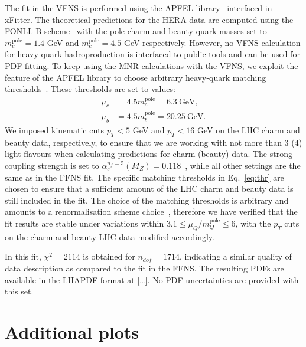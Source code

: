 \documentclass[12pt]{article}
\begin{document}
The fit in the VFNS is performed using the APFEL library~\cite{Bertone:2013vaa} interfaced in xFitter.
The theoretical predictions for the HERA data are computed using the FONLL-B scheme~\cite{Forte:2010ta} with the pole charm and beauty quark masses set to $m_c^{\textrm{pole}} = 1.4$ GeV and $m_c^{\textrm{pole}} = 4.5$ GeV respectively.
However, no VFNS calculation for heavy-quark hadroproduction is interfaced to public tools and can be used for PDF fitting.
To keep using the MNR calculations with the VFNS, we exploit the feature of the APFEL library to choose arbitrary heavy-quark matching thresholds~\cite{Bertone:2017ehk}. These thresholds are set to values:
\begin{equation}
\begin{aligned}
\mu_c &= 4.5m_c^{\textrm{pole}} = 6.3~\textrm{GeV},\\
\mu_b &= 4.5m_b^{\textrm{pole}} =  20.25~\textrm{GeV}.
\label{eq:thr}
\end{aligned}
\end{equation}
We imposed kinematic cuts $p_T < 5$ GeV and $p_T < 16$ GeV on the LHC charm and beauty data, respectively, to ensure that we are working with not more than 3 (4) light flavours when calculating predictions for charm (beauty) data.
The strong coupling strength is set to $\alpha_s^{n_f = 5}(M_Z) = 0.118$~\cite{Tanabashi:2018oca}, while all other settings are the same as in the FFNS fit.
The specific matching thresholds in Eq.~\ref{eq:thr} are chosen to ensure that a sufficient amount of the LHC charm and beauty data is still included in the fit.
The choice of the matching thresholds is arbitrary and amounts to a renormalisation scheme choice~\cite{Bertone:2017ehk}, therefore we have verified that the fit results are stable under variations within $3.1 \le \mu_Q/m_Q^{\textrm{pole}} \le 6$, with the $p_T$ cuts on the charm and beauty LHC data modified accordingly.

In this fit, $\chi^2 = 2114$ is obtained for $n_{dof} = 1714$, indicating a similar quality of data description as compared to the fit in the FFNS.
The resulting PDFs are available in the LHAPDF format at [\dots]. No PDF uncertainties are provided with this set.

\section{Additional plots}
\label{sec:extraplots}

\end{document}

